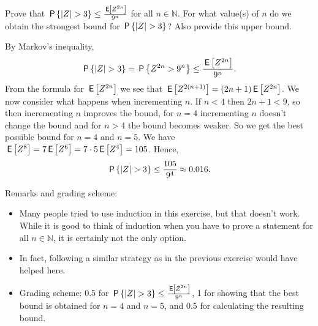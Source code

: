\begin{exercise}[2]
Prove that $\P{|Z| > 3} \leq \frac{\E{Z^{2n}}}{9^n}$ for all $n \in \mathbb N$. 
For what value(s) of $n$ do we obtain the strongest bound for $\P{|Z| > 3}$? Also provide this upper bound. \\
\begin{solution}
 By Markov's inequality,
\begin{equation*}
\P{|Z| > 3} = \P{Z^{2n} > 9^n} \leq \frac{\E{Z^{2n}}}{9^n}.
\end{equation*}
From the formula for $\E{Z^{2n}}$ we see that $\E{Z^{2(n+1)}} = (2n+1)\E{Z^{2n}}$. We now consider what happens when incrementing $n$. If $n < 4$ then $2n+1 < 9$, so then incrementing $n$ improves the bound, for $n=4$ incrementing $n$ doesn't change the bound and for $n >4$ the bound becomes weaker. So we get the best possible bound for $n=4$ and $n=5$.
We have $\E{Z^8} = 7\E{Z^6} = 7\cdot 5\E{Z^4} = 105$. Hence,
$$\P{|Z| > 3} \leq \frac{105}{9^4} \approx 0.016.$$

\noindent Remarks and grading scheme:

\begin{itemize}
\item Many people tried to use induction in this exercise, but that doesn't work. While it is good to think of induction when you have to prove a statement for all $n \in \mathbb N$, it is certainly not the only option. 
\item In fact, following a similar strategy as in the previous exercise would have helped here. 
\item Grading scheme: 0.5 for $\P{|Z| > 3} \leq \frac{\E{Z^{2n}}}{9^n}$, 1 for showing that the best bound is obtained for $n=4$ and $n=5$, and 0.5 for calculating the resulting bound. 
\end{itemize}
\end{solution}
\end{exercise}


